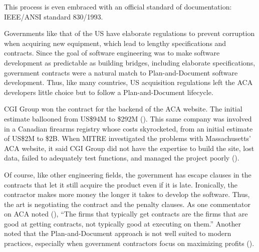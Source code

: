 
This process is even embraced with an official standard of
documentation: IEEE/ANSI standard 830/1993.

Governments like that of the US have elaborate regulations to prevent corruption when acquiring new equipment, which lead to lengthy specifications and contracts. Since the goal of software engineering was to make software development as predictable as building bridges, including elaborate specifications, government contracts were a natural match to Plan-and-Document software development. Thus, like many countries, US acquisition regulations left the ACA developers little choice but to follow a Plan-and-Document lifecycle.

\begin{sidebar}[-1.00in]{CGI Group} won the contract for the backend of the ACA website. The initial estimate ballooned from US\$94M to \$292M (\cite{Begley13}). This same company was involved in a Canadian firearms registry whose costs skyrocketed, from an initial estimate of US\$2M to \$2B. When MITRE investigated the problems with Massachusetts' ACA website, it said CGI Group did not have the expertise to build the site, lost data, failed to adequately test functions, and managed the project poorly (\cite{Bidgood14}).
\end{sidebar}

Of course, like other engineering fields, the government has
escape clauses in the contracts that let it still acquire the product even if it is late. Ironically, the contractor makes more money the longer it takes to develop the software. Thus, the art is negotiating the contract and the penalty clauses. As one commentator on ACA noted (\cite{Howard13}), ``The firms that typically get contracts are the firms that are good at getting contracts, not typically good at executing on them.'' Another noted that the Plan-and-Document approach is not well suited to modern practices, especially when government contractors focus on maximizing profits (\cite{Chung13}).



